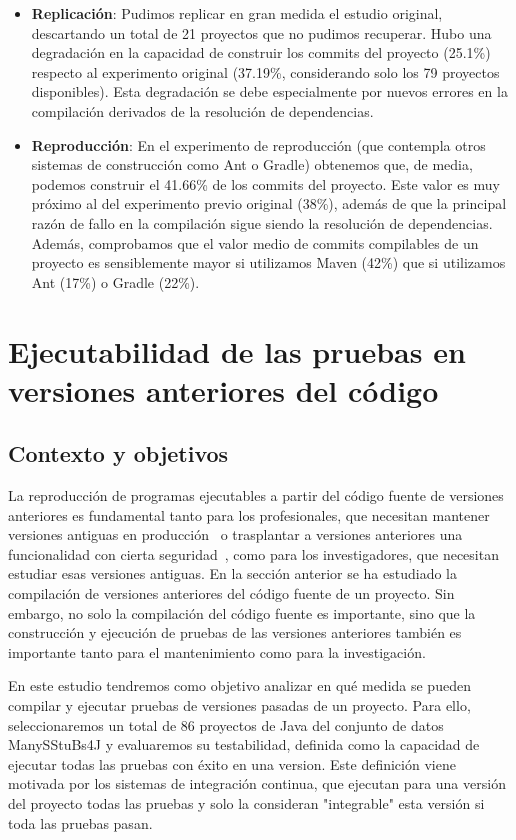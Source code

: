 \begin{itemize}
    \item \textbf{Replicación}: Pudimos replicar en gran medida el estudio original, descartando un total de 21 proyectos que no pudimos recuperar. 
    Hubo una degradación en la capacidad de construir los commits del proyecto (25.1\%) respecto al experimento original (37.19\%, considerando solo los 79 proyectos disponibles). Esta degradación se debe especialmente por nuevos errores en la compilación derivados de la resolución de dependencias.
    \item \textbf{Reproducción}: En el experimento de reproducción (que contempla otros sistemas de construcción como Ant o Gradle) obtenemos que, de media, podemos construir el 41.66\% de los commits del proyecto. Este valor es muy próximo al del experimento previo original (38\%), además de que la principal razón de fallo en la compilación sigue siendo la resolución de dependencias. Además, comprobamos que el valor medio de commits compilables de un proyecto es sensiblemente mayor si utilizamos Maven (42\%) que si utilizamos Ant (17\%) o Gradle (22\%).
\end{itemize}

\section{Ejecutabilidad de las pruebas en versiones anteriores del código}
\label{sec:resumen:testability}

\subsection{Contexto y objetivos}

La reproducción de programas ejecutables a partir del código fuente de versiones anteriores es fundamental tanto para los profesionales, que necesitan mantener versiones antiguas en producción~\cite{bartelsoftware} o trasplantar a versiones anteriores una funcionalidad con cierta seguridad~\cite{tian2017mining}, como para los investigadores, que necesitan estudiar esas versiones antiguas. 
En la sección anterior se ha estudiado la compilación de versiones anteriores del código fuente de un proyecto.
Sin embargo, no solo la compilación del código fuente es importante, sino que la construcción y ejecución de pruebas de las versiones anteriores también es importante tanto para el mantenimiento como para la investigación.

En este estudio tendremos como objetivo analizar en qué medida se pueden compilar y ejecutar pruebas de versiones pasadas de un proyecto. 
Para ello, seleccionaremos un total de 86 proyectos de Java del conjunto de datos ManySStuBs4J y evaluaremos su testabilidad, definida como la capacidad de ejecutar todas las pruebas con éxito en una version. Este definición viene motivada por los sistemas de integración continua, que ejecutan para una versión del proyecto todas las pruebas y solo la consideran "integrable" esta versión si toda las pruebas pasan.

